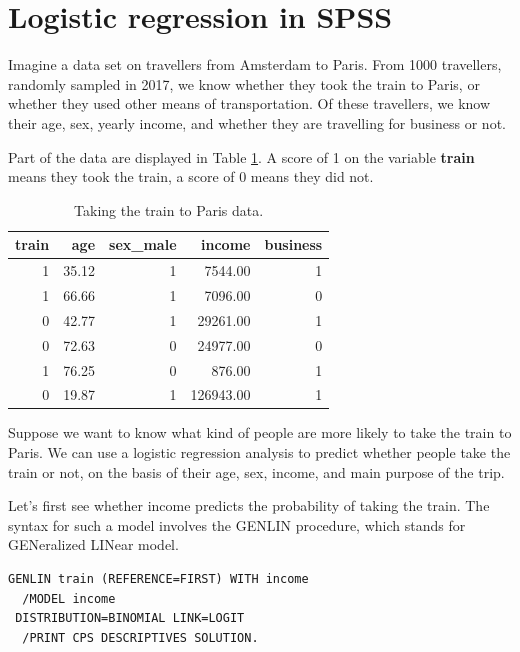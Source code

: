 \documentclass[]{report}\usepackage[]{graphicx}\usepackage[]{color}
\begin{document}
\section{Logistic regression in SPSS}

Imagine a data set on travellers from Amsterdam to Paris. From 1000 travellers, randomly sampled in 2017, we know whether they took the train to Paris, or whether they used other means of transportation. Of these travellers, we know their age, sex, yearly income, and whether they are travelling for business or not.

Part of the data are displayed in Table \ref{tab:gen_12}. A score of 1 on the variable \textbf{train} means they took the train, a score of 0 means they did not.



\begin{table}[ht]
\centering
\caption{Taking the train to Paris data.} 
\label{tab:gen_12}
\begin{tabular}{rrrrr}
  \hline
train & age & sex\_male & income & business \\ 
  \hline
  1 & 35.12 &   1 & 7544.00 &   1 \\ 
    1 & 66.66 &   1 & 7096.00 &   0 \\ 
    0 & 42.77 &   1 & 29261.00 &   1 \\ 
    0 & 72.63 &   0 & 24977.00 &   0 \\ 
    1 & 76.25 &   0 & 876.00 &   1 \\ 
    0 & 19.87 &   1 & 126943.00 &   1 \\ 
   \hline
\end{tabular}
\end{table}



Suppose we want to know what kind of people are more likely to take the train to Paris. We can use a logistic regression analysis to predict whether people take the train or not, on the basis of their age, sex, income, and main purpose of the trip.

Let's first see whether income predicts the probability of taking the train. The syntax for such a model involves the GENLIN procedure, which stands for GENeralized LINear model.



\begin{verbatim}
GENLIN train (REFERENCE=FIRST) WITH income
  /MODEL income
 DISTRIBUTION=BINOMIAL LINK=LOGIT
  /PRINT CPS DESCRIPTIVES SOLUTION.
\end{verbatim}
\end{document}
